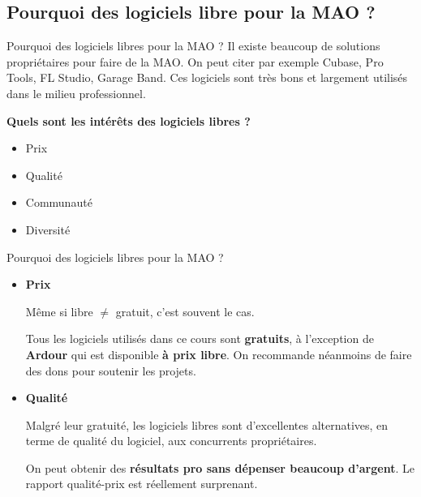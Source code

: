 \documentclass{beamer}
\begin{document}
\subsection{Pourquoi des logiciels libre pour la MAO ?}
\begin{frame}{Pourquoi des logiciels libres pour la MAO ?}
  Il existe beaucoup de solutions propriétaires pour faire de la MAO. On peut citer par exemple Cubase, Pro Tools, FL Studio, Garage Band. Ces logiciels sont très bons et largement utilisés dans le milieu professionnel.
  \medskip
  
  \textbf{Quels sont les intérêts des logiciels libres ?}
  \begin{itemize}
  \item Prix
  \item Qualité
  \item Communauté
  \item Diversité
  \end{itemize}
\end{frame}

\begin{frame}{Pourquoi des logiciels libres pour la MAO ?}
  \begin{itemize}
  \item \textbf{Prix}
  
    Même si libre $\neq$ gratuit, c'est souvent le cas.
    
    Tous les logiciels utilisés dans ce cours sont \textbf{gratuits}, à l'exception de \textbf{Ardour} qui est disponible \textbf{à prix libre}. On recommande néanmoins de faire des dons pour soutenir les projets.
    
  \item \textbf{Qualité}
    
    Malgré leur gratuité, les logiciels libres sont d'excellentes alternatives, en terme de qualité du logiciel, aux concurrents propriétaires.
    
    On peut obtenir des \textbf{résultats pro sans dépenser beaucoup d'argent}. Le rapport qualité-prix est réellement surprenant.
  \end{itemize}
\end{frame}
\end{document}
